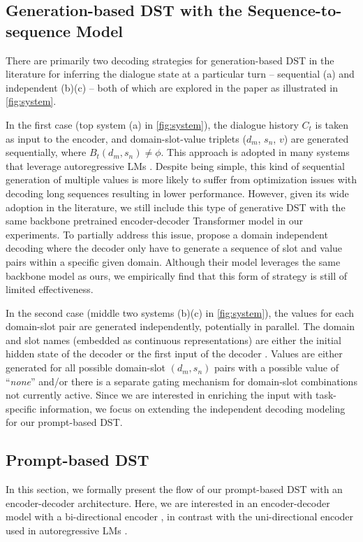 \documentclass[11pt]{article}
\begin{document}
\subsection{Generation-based DST with the Sequence-to-sequence Model}
There are primarily two decoding strategies for generation-based DST in the literature for inferring the dialogue state at a particular turn -- sequential (a) and independent (b)(c) -- both of which are explored in the paper as illustrated in \autoref{fig:system}. 

In the first case (top system (a) in \autoref{fig:system}), the dialogue history $C_t$ is taken as input to the encoder, and domain-slot-value triplets ($d_m$, $s_n$, $v$) are generated sequentially, where $B_t(d_m, s_n)\neq\phi$. This approach is adopted in many systems that leverage autoregressive LMs \cite{peng2020soloist,hosseini2020simple}. 
Despite being simple, this kind of sequential generation of multiple values is more likely to suffer from optimization issues with decoding long sequences resulting in lower performance. However, given its wide adoption in the literature, we still include this type of generative DST with the same backbone pretrained encoder-decoder Transformer model in our experiments.
To partially address this issue, \citet{lin2020mintl} propose a domain independent decoding where the decoder only have to generate a sequence of slot and value pairs within a specific given domain. Although their model leverages the same backbone model as ours, we empirically find that this form of strategy is still of limited effectiveness.

In the second case (middle two systems (b)(c) in \autoref{fig:system}), the values for each domain-slot pair are generated independently, potentially in parallel.  
The domain and slot names (embedded as continuous representations) are either the initial hidden state of the decoder \cite{kim2020efficient} or the first input of the decoder \cite{wu2019transferable}.
Values are either generated for all possible domain-slot $(d_m, s_n)$ pairs with a possible value of ``\textit{none}'' and/or there is a separate gating mechanism for domain-slot combinations not currently active.
Since we are interested in enriching the input with task-specific information, we focus on extending the independent decoding modeling for our prompt-based DST.

\subsection{Prompt-based DST}
In this section, we formally present the flow of our prompt-based DST with an encoder-decoder architecture.
Here, we are interested in an encoder-decoder model with a bi-directional encoder \cite{raffel2020exploring,lewis-etal-2020-bart}, in contrast with the uni-directional encoder used in autoregressive LMs \cite{radford2019language,gpt3}.
\end{document}
